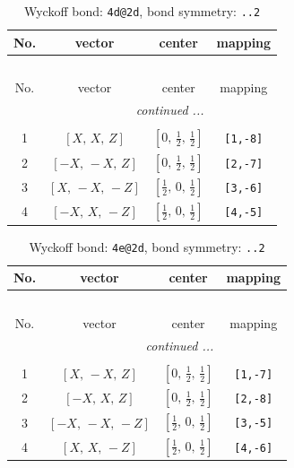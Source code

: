 \documentclass[fleqn,8pt]{jsarticle}
\begin{document}
\begin{longtable}{cccc}
\caption{Wyckoff bond: {\tt 4d@2d}, bond symmetry: {\tt ..2}}
 \\
 \hline \hline
No. & vector & center & mapping \\ \hline \endfirsthead

\multicolumn{3}{l}{\tablename\ \thetable{}} \\
 \hline \hline
No. & vector & center & mapping \\ \hline \endhead

 \hline \hline
\multicolumn{3}{r}{\footnotesize\it continued ...} \\ \endfoot

 \hline \hline
\multicolumn{3}{r}{} \\ \endlastfoot

1 & $\left[ X,\, X,\, Z \right]$ & $\left[ 0,\, \frac{1}{2},\, \frac{1}{2} \right]$ & {\tt [1,-8]} \\ \hline
2 & $\left[ - X,\, - X,\, Z \right]$ & $\left[ 0,\, \frac{1}{2},\, \frac{1}{2} \right]$ & {\tt [2,-7]} \\ \hline
3 & $\left[ X,\, - X,\, - Z \right]$ & $\left[ \frac{1}{2},\, 0,\, \frac{1}{2} \right]$ & {\tt [3,-6]} \\ \hline
4 & $\left[ - X,\, X,\, - Z \right]$ & $\left[ \frac{1}{2},\, 0,\, \frac{1}{2} \right]$ & {\tt [4,-5]} \\
\end{longtable}
\renewcommand{\arraystretch}{1.2}
\begin{longtable}{cccc}
\caption{Wyckoff bond: {\tt 4e@2d}, bond symmetry: {\tt ..2}}
 \\
 \hline \hline
No. & vector & center & mapping \\ \hline \endfirsthead

\multicolumn{3}{l}{\tablename\ \thetable{}} \\
 \hline \hline
No. & vector & center & mapping \\ \hline \endhead

 \hline \hline
\multicolumn{3}{r}{\footnotesize\it continued ...} \\ \endfoot

 \hline \hline
\multicolumn{3}{r}{} \\ \endlastfoot

1 & $\left[ X,\, - X,\, Z \right]$ & $\left[ 0,\, \frac{1}{2},\, \frac{1}{2} \right]$ & {\tt [1,-7]} \\ \hline
2 & $\left[ - X,\, X,\, Z \right]$ & $\left[ 0,\, \frac{1}{2},\, \frac{1}{2} \right]$ & {\tt [2,-8]} \\ \hline
3 & $\left[ - X,\, - X,\, - Z \right]$ & $\left[ \frac{1}{2},\, 0,\, \frac{1}{2} \right]$ & {\tt [3,-5]} \\ \hline
4 & $\left[ X,\, X,\, - Z \right]$ & $\left[ \frac{1}{2},\, 0,\, \frac{1}{2} \right]$ & {\tt [4,-6]} \\
\end{longtable}
\end{document}
